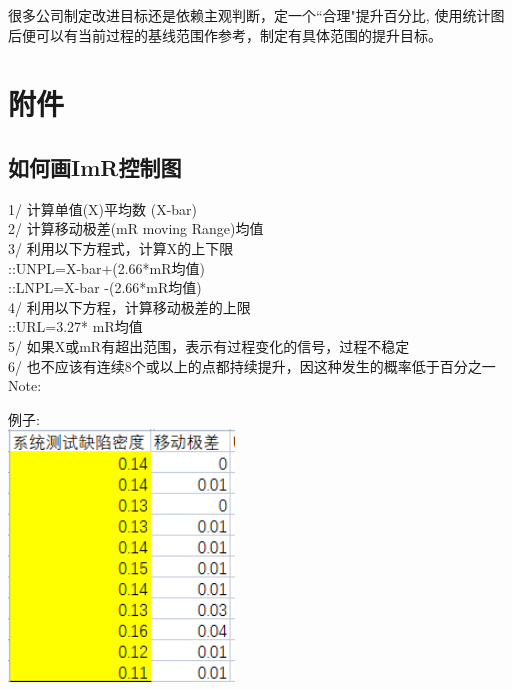 很多公司制定改进目标还是依赖主观判断，定一个``合理"提升百分比,
使用统计图后便可以有当前过程的基线范围作参考，制定有具体范围的提升目标。

\hypertarget{ux9644ux4ef6}{%
\section{附件}\label{ux9644ux4ef6}}

\hypertarget{ux5982ux4f55ux753bimrux63a7ux5236ux56fe}{%
\subsection{如何画ImR控制图}\label{ux5982ux4f55ux753bimrux63a7ux5236ux56fe}}

1/ 计算单值(X)平均数 (X-bar)\\
2/ 计算移动极差(mR moving Range)均值\\
3/ 利用以下方程式，计算X的上下限\\
::UNPL=X-bar+(2.66*mR均值)\\
::LNPL=X-bar -(2.66*mR均值)\\
4/ 利用以下方程，计算移动极差的上限\\
::URL=3.27* mR均值\\
5/ 如果X或mR有超出范围，表示有过程变化的信号，过程不稳定\\
6/ 也不应该有连续8个或以上的点都持续提升，因这种发生的概率低于百分之一\\
Note:

\begin{description}
\item[]
\end{description}

例子:\\

\includegraphics[width=6cm]{微信截图_20210929131748.png}

